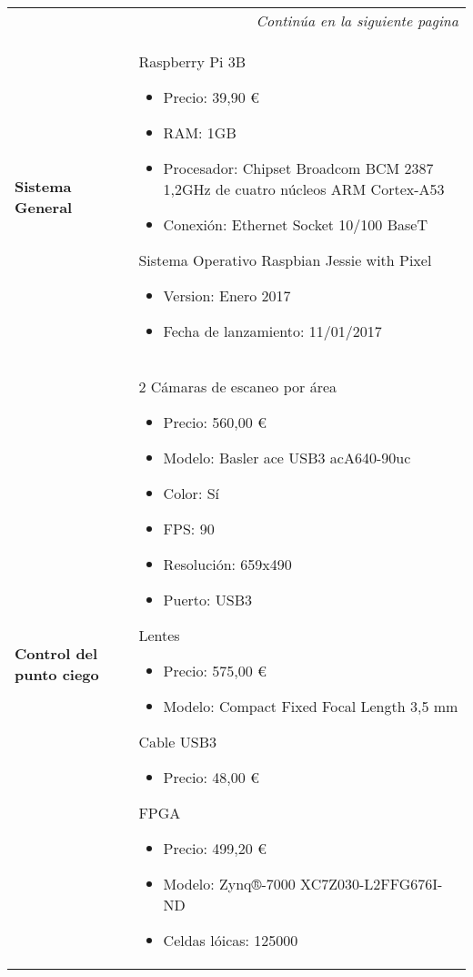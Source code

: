 \begin{center}
\begin{longtable}{p{5cm} p{8cm}}

\hline
\endfirsthead
\hline
\endhead

\hline \multicolumn{2}{r}{\textit{Continúa en la siguiente pagina}} \\
\endfoot
\hline
\endlastfoot

\textbf{Sistema General} &
Raspberry Pi 3B
\begin{itemize}
    \item Precio: 39,90 \euro
    \item RAM: 1GB
    \item Procesador: Chipset Broadcom BCM 2387 1,2GHz de cuatro núcleos ARM Cortex-A53
    \item Conexión: Ethernet Socket 10/100 BaseT
\end{itemize}
Sistema Operativo Raspbian Jessie with Pixel
\begin{itemize}
    \item Version: Enero 2017
    \item Fecha de lanzamiento: 11/01/2017
\end{itemize}
\\ \hline

\textbf{Control del punto ciego} &
2 Cámaras de escaneo por área
\begin{itemize}
    \item Precio: 560,00 \euro
    \item Modelo: Basler ace USB3 acA640-90uc
    \item Color: Sí
    \item FPS: 90
    \item Resolución: 659x490
    \item Puerto: USB3
\end{itemize}
Lentes
\begin{itemize}
    \item Precio: 575,00 \euro
    \item Modelo: Compact Fixed Focal Length 3,5 mm
\end{itemize}
Cable USB3
\begin{itemize}
    \item Precio: 48,00 \euro
\end{itemize}
FPGA
\begin{itemize}
    \item Precio: 499,20 \euro
    \item Modelo: Zynq®-7000 XC7Z030-L2FFG676I-ND
    \item Celdas lóicas: 125000
\end{itemize}



\end{longtable}
\end{center}
